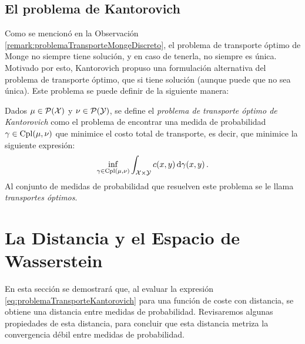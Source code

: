 {  \subsection*{El problema de Kantorovich}
  {
	  Como se mencionó en la Observación \ref*{remark:problemaTransporteMongeDiscreto}, el problema de transporte óptimo de Monge no siempre tiene solución, y en caso de tenerla, no siempre es única. Motivado por esto, Kantorovich propuso una formulación alternativa del problema de transporte óptimo, que si tiene solución (aunque puede que no sea única). Este problema se puede definir de la siguiente manera:
	  \begin{definition}
		  Dados $\mu \in \ProbSpace[\cX]$ y $\nu \in \ProbSpace[\cY]$, se define el \emph{problema de transporte óptimo de Kantorovich} como el problema de encontrar una medida de probabilidad $\gamma \in \Cpl(\mu, \nu)$ que minimice el costo total de transporte, es decir, que minimice la siguiente expresión:
		  \begin{equation}
			  \label{eq:problemaTransporteKantorovich}
			  \inf_{\gamma \in \Cpl(\mu, \nu)} \int_{\cX \times \cY} c(x, y) \dgamma[x, y] .
		  \end{equation}
		  Al conjunto de medidas de probabilidad que resuelven este problema se le llama \emph{transportes óptimos}.
	  \end{definition}

  }

  \section{La Distancia y el Espacio de Wasserstein}\label{sec:la-distancia-y-el-espacio-de-Wasserstein}
  {
	  En esta sección se demostrará que, al evaluar la expresión \eqref{eq:problemaTransporteKantorovich} para una función de coste con distancia, se obtiene una distancia entre medidas de probabilidad. Revisaremos algunas propiedades de esta distancia, para concluir que esta distancia metriza la convergencia débil entre medidas de probabilidad.

}}
